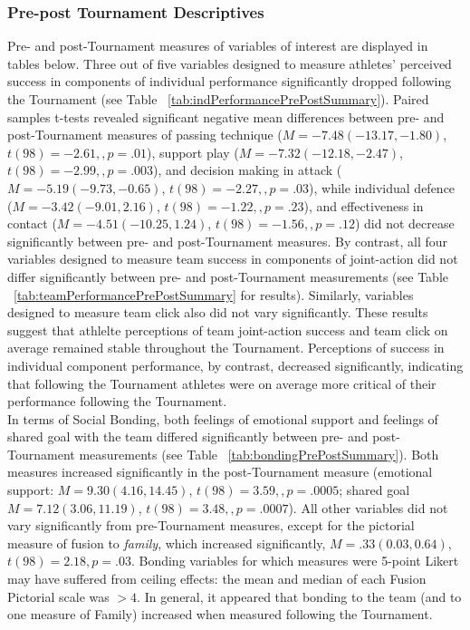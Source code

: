 \documentclass[12pt]{report}
\begin{document}
{\subsubsection{Pre-post Tournament Descriptives}
Pre- and post-Tournament measures of variables of interest are displayed in tables below.  Three out of five variables designed to measure athletes' perceived success in components of individual performance significantly dropped following the Tournament (see Table ~\ref{tab:indPerformancePrePostSummary}).  Paired samples t-tests revealed significant negative mean differences between pre- and post-Tournament measures of passing technique
($M = -7.48 (-13.17, -1.80)$, $t(98)= -2.61,, p = .01$), support play ($M = -7.32 (-12.18, -2.47)$, $t(98)= -2.99,, p = .003$), and decision making in attack ($M = -5.19 ( -9.73, -0.65)$, $t(98)= -2.27,, p = .03$), while individual defence ($M = -3.42 (-9.01, 2.16)$, $t(98)= -1.22,, p = .23$), and effectiveness in contact ($M = -4.51 (-10.25, 1.24)$, $t(98)= -1.56,, p = .12$) did not decrease significantly between pre- and post-Tournament measures.  By contrast, all four variables designed to measure team success in components of joint-action did not differ significantly between pre- and post-Tournament measurements (see Table ~\ref{tab:teamPerformancePrePostSummary} for results).  Similarly, variables designed to measure team click also did not vary significantly.  These results suggest that athlelte perceptions of team joint-action success and team click on average remained stable throughout the Tournament.  Perceptions of success in individual component performance, by contrast, decreased significantly, indicating that following the Tournament athletes were on average more critical of their performance following the Tournament.\\

In terms of Social Bonding, both feelings of emotional support and feelings of shared goal with the team differed significantly between pre- and post-Tournament measurements (see Table ~\ref{tab:bondingPrePostSummary}). Both measures increased significantly in the post-Tournament measure (emotional support: $M = 9.30 (4.16, 14.45)$, $t(98)= 3.59,, p = .0005$; shared goal $M = 7.12 (3.06, 11.19)$, $t(98)= 3.48,, p = .0007$).  All other variables did not vary significantly from pre-Tournament measures, except for the pictorial measure of fusion to \textit{family}, which increased significantly, $M = .33 (0.03, 0.64)$, $t(98)= 2.18, p = .03$.  Bonding variables for which measures were 5-point Likert may have suffered from ceiling effects: the mean and median of each Fusion Pictorial scale was $> 4$.  In general, it appeared that bonding to the team (and to one measure of Family) increased when measured following the Tournament.

}
\end{document}
